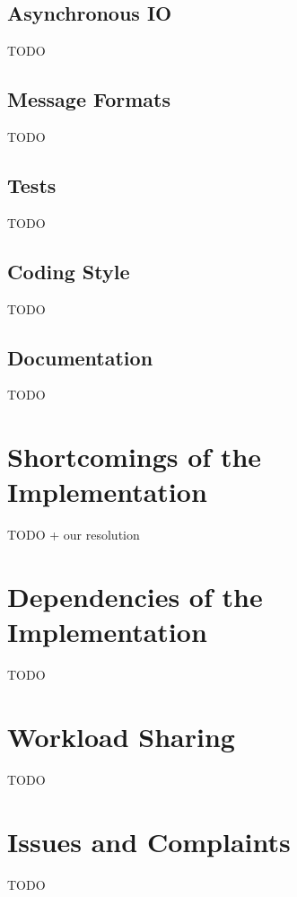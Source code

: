 \documentclass[a4paper, 11pt]{article}
\begin{document}
\subsection{Asynchronous IO}
TODO

\subsection{Message Formats}
TODO

\subsection{Tests}
TODO

\subsection{Coding Style}
TODO

\subsection{Documentation}
TODO


\section*{Shortcomings of the Implementation}
TODO + our resolution


\section*{Dependencies of the Implementation}
TODO


\section*{Workload Sharing}
TODO


\section*{Issues and Complaints}
TODO
\end{document}
